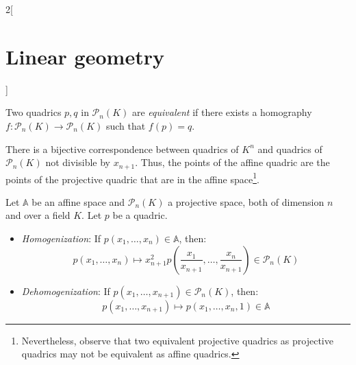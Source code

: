 \documentclass[../../../main.tex]{subfiles}
\begin{document}
\begin{multicols}{2}[\section{Linear geometry}]
\begin{definition}
    \end{definition}
    \begin{definition}
        Two quadrics $p,q$ in $\mathcal{P}_n(K)$ are \textit{equivalent} if there exists a homography $f:\mathcal{P}_n(K)\rightarrow\mathcal{P}_n(K)$ such that $f(p)=q$.
    \end{definition}
    \begin{theorem}
        There is a bijective correspondence between quadrics of $K^n$ and quadrics of $\mathcal{P}_n(K)$ not divisible by $x_{n+1}$. Thus, the points of the affine quadric are the points of the projective quadric that are in the affine space\footnote{Nevertheless, observe that two equivalent projective quadrics as projective quadrics may not be equivalent as affine quadrics.}.
    \end{theorem}
    \begin{prop}
        Let $\mathbb{A}$ be an affine space and $\mathcal{P}_n(K)$ a projective space, both of dimension $n$ and over a field $K$. Let $p$ be a quadric.
        \begin{itemize}
            \item\textit{Homogenization}: If $p(x_1,\ldots,x_n)\in\mathbb{A}$, then: $$p(x_1,\ldots,x_n)\mapsto x_{n+1}^2p\left(\frac{x_1}{x_{n+1}},\ldots,\frac{x_n}{x_{n+1}}\right)\in\mathcal{P}_n(K)$$
            \item\textit{Dehomogenization}: If $p(x_1,\ldots,x_{n+1})\in\mathcal{P}_n(K)$, then: $$p(x_1,\ldots,x_{n+1})\mapsto p(x_1,\ldots,x_n,1)\in\mathbb{A}$$
        \end{itemize}
    \end{prop}

\end{multicols}
\end{document}

